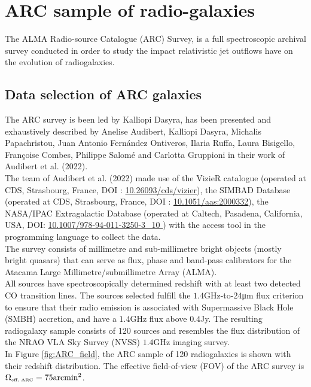 \chapter{ARC sample of radio-galaxies}
\label{chp:dataset}
\captionsetup{width=0.75\textwidth}


The ALMA Radio-source Catalogue (ARC) Survey, is a full spectroscopic archival survey conducted in order to study the impact relativistic jet outflows have on the evolution of radiogalaxies.

\section{Data selection of ARC galaxies} \label{sec:ARCsurv}

The ARC survey is been led by Kalliopi Dasyra, has been presented and exhaustively described by Anelise Audibert, Kalliopi Dasyra, Michalis Papachristou, Juan Antonio Fernández Ontiveros, Ilaria Ruffa, Laura Bisigello, Françoise Combes, Philippe Salomé and Carlotta Gruppioni in their work of  Audibert et al. (2022)\cite{Audibert2022}.\\
The team of Audibert et al. (2022)\cite{Audibert2022} made use of the VizieR catalogue (operated at CDS, Strasbourg, France, DOI : \url{10.26093/cds/vizier}), the SIMBAD Database (operated at CDS, Strasbourg, France, DOI : \url{10.1051/aas:2000332}), the NASA/IPAC Extragalactic Database (operated at Caltech, Pasadena, California, USA, DOI: \url{10.1007/978-94-011-3250-3\_10 }) with the \cite{astroquery} access tool in the  programming language to collect the data. \\  
The survey consists of millimetre and sub-millimetre bright objects (mostly bright quasars) that can serve as flux, phase and band-pass calibrators for the  Atacama Large Millimetre/submillimetre Array (ALMA).\\
All sources have spectroscopically determined redshift with at least two detected CO transition lines. The sources selected fulfill the $1.4$GHz-to-$24$μm flux criterion to ensure that their radio emission is associated with Supermassive Black Hole (SMBH) accretion, and have a $1.4$GHz flux above $0.4$Jy. The resulting radiogalaxy sample consists of 120 sources and resembles the flux distribution of the NRAO VLA Sky Survey (NVSS) $1.4$GHz imaging survey.\\ 
In Figure \ref{fig:ARC_field}, the ARC sample of 120 radiogalaxies is shown with their redshift distribution. The effective field-of-view (FOV) of the ARC survey is $\Omega_{\mbox{\tiny{eff, ARC}}} = 75 \mbox{arcmin}^2 $.
